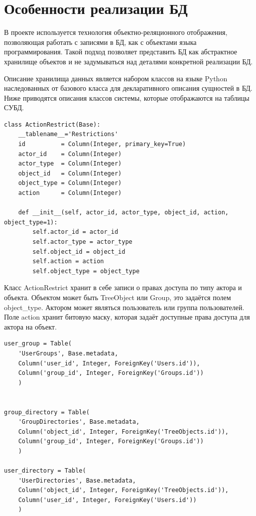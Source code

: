 \documentclass[utf8,usehyperref,12pt]{G7-32}
\begin{document}
\section{Особенности реализации БД}
В проекте используется технология объектно-реляционного отображения, позволяющая работать с записями в БД, как с объектами языка программирования. Такой подход позволяет представить БД как абстрактное хранилище объектов и не задумываться над деталями конкретной реализации БД. 

Описание хранилища данных является набором классов на языке Python наследованных от базового класса для декларативного описания сущностей в БД. Ниже приводятся описания классов системы, которые отображаются на таблицы СУБД.

\begin{verbatim}
class ActionRestrict(Base):
    __tablename__='Restrictions'
    id          = Column(Integer, primary_key=True)
    actor_id    = Column(Integer)
    actor_type  = Column(Integer)    
    object_id   = Column(Integer)
    object_type = Column(Integer)
    action      = Column(Integer)    

    def __init__(self, actor_id, actor_type, object_id, action, object_type=1):
        self.actor_id = actor_id
        self.actor_type = actor_type
        self.object_id = object_id
        self.action = action
        self.object_type = object_type       
\end{verbatim}

Класс ActionRestrict хранит в себе записи о правах доступа по типу актора и объекта. Объектом может быть TreeObject или Group, это задаётся полем object\_type. Актором может являться пользователь или группа пользователей. Поле action хранит битовую маску, которая задаёт доступные права доступа для актора на объект.

\begin{verbatim}
user_group = Table(
    'UserGroups', Base.metadata,    
    Column('user_id', Integer, ForeignKey('Users.id')),
    Column('group_id', Integer, ForeignKey('Groups.id'))
    )
    
    
group_directory = Table(
    'GroupDirectories', Base.metadata,    
    Column('object_id', Integer, ForeignKey('TreeObjects.id')),
    Column('group_id', Integer, ForeignKey('Groups.id'))
    )
    
user_directory = Table(
    'UserDirectories', Base.metadata,    
    Column('object_id', Integer, ForeignKey('TreeObjects.id')),
    Column('user_id', Integer, ForeignKey('Users.id'))
    )
\end{verbatim}
\end{document}
